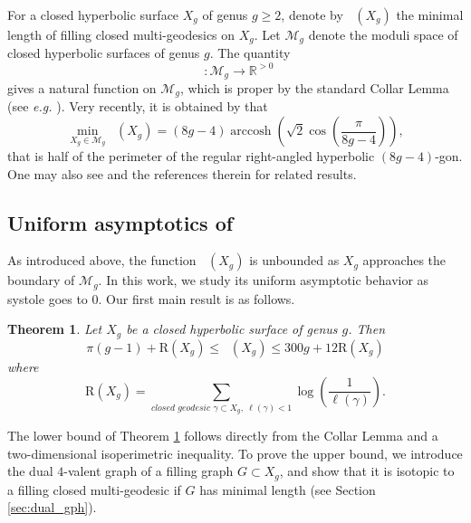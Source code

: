\documentclass[UTF8]{amsart}
\newtheorem{theorem}{Theorem}[section]
\numberwithin{equation}{section}
\theoremstyle{definition}
\theoremstyle{example}
\theoremstyle{remark}
\DeclareMathOperator{\arccosh}{arccosh}
\DeclareMathOperator{\slfs}{\mathcal{L}_{sys}^{fill}}
\newcommand{\sM}{\mathcal{M}}
\begin{document}
For a closed hyperbolic surface $X_g$ of genus $g \geq 2$, denote by $\slfs(X_g)$ the minimal length of filling closed multi-geodesics on $X_g$. Let $\mathcal{M}_g$ denote the moduli space of closed hyperbolic surfaces of genus $g$. The quantity
\[\slfs:\sM_g \to \mathbb{R}^{>0}\]
gives a natural function on $\sM_g$, which is proper by the standard Collar Lemma (see \emph{e.g.} \cite[Theorem 4.4.6]{buser2010geometry}). Very recently, it is obtained by \cite{gao2025shortest} that
\[\min\limits_{X_g\in \sM_g}\slfs(X_g)=(8g-4)\arccosh\left(\sqrt{2}\cos\left(\frac{\pi}{8g-4}\right)\right),\]
that is half of the perimeter of the regular right-angled hyperbolic $(8g-4)$-gon. One may also see \cite{Are15, aougab2015minimally, sanki2021conjecture, gaster2021short} and the references therein for related results. 
\subsection{Uniform asymptotics of $\slfs$}
As introduced above, the function $\slfs(X_g)$ is unbounded as $X_g$ approaches the boundary of $\sM_g$. In this work, we study its uniform asymptotic behavior as systole goes to $0$. Our first main result is as follows.
\begin{theorem}\label{mt-1}
Let $X_g$ be a closed hyperbolic surface of genus $g$. Then
\[\pi (g-1)+\mathrm{R}(X_g) \le \slfs(X_g) \le 300g+12\mathrm{R}(X_g)\]
where
\[
	\mathrm{R}(X_g) = \sum\limits_{\textit{closed geodesic }\gamma\subset X_g, \ \ell(\gamma)<1} \log \left(\frac{1}{\ell(\gamma)}\right). 
\]
\end{theorem}
\noindent The lower bound of Theorem \ref{mt-1} follows directly from the Collar Lemma and a two-dimensional isoperimetric inequality. To prove the upper bound, we introduce the dual $4$-valent graph of a filling graph $G\subset X_g$, and show that it is isotopic to a filling closed multi-geodesic if $G$ has minimal length (see Section \ref{sec:dual_gph}). 
\end{document}
